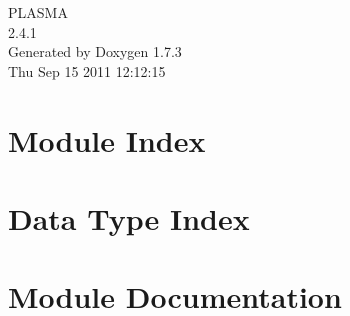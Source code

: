 \documentclass[a4paper]{book}
\begin{document}
\hypersetup{pageanchor=false}
\begin{titlepage}
\vspace*{7cm}
\begin{center}
{\Large PLASMA \\[1ex]\large 2.4.1 }\\
\vspace*{1cm}
{\large Generated by Doxygen 1.7.3}\\
\vspace*{0.5cm}
{\small Thu Sep 15 2011 12:12:15}\\
\end{center}
\end{titlepage}
\clearemptydoublepage
{}
\tableofcontents
\clearemptydoublepage
{}
\hypersetup{pageanchor=true}
\chapter{Module Index}

\chapter{Data Type Index}

\chapter{Module Documentation}












\end{document}
